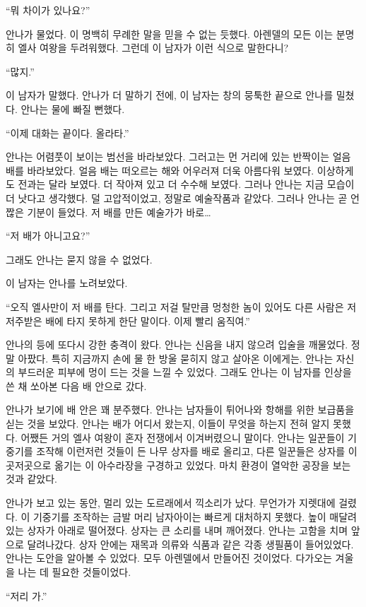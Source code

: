 ``뭐 차이가 있나요?''

안나가 물었다. 이 명백히 무례한 말을 믿을 수 없는 듯했다. 아렌델의 모든 이는 분명히 엘사 여왕을 두려워했다. 그런데 이 남자가 이런 식으로 말한다니?

``많지.''

이 남자가 말했다. 안나가 더 말하기 전에, 이 남자는 창의 뭉툭한 끝으로 안나를 밀쳤다. 안나는 물에 빠질 뻔했다.

``이제 대화는 끝이다. 올라타.''

안나는 어렴풋이 보이는 범선을 바라보았다. 그러고는 먼 거리에 있는 반짝이는 얼음 배를 바라보았다. 얼음 배는 떠오르는 해와 어우러져 더욱 아름다워 보였다. 이상하게도 전과는 달라 보였다. 더 작아져 있고 더 수수해 보였다. 그러나 안나는 지금 모습이 더 낫다고 생각했다. 덜 고압적이었고, 정말로 예술작품과 같았다. 그러나 안나는 곧 언짢은 기분이 들었다. 저 배를 만든 예술가가 바로\ldots

``저 배가 아니고요?''

그래도 안나는 묻지 않을 수 없었다.

이 남자는 안나를 노려보았다.

``오직 엘사만이 저 배를 탄다. 그리고 저걸 탈만큼 멍청한 놈이 있어도 다른 사람은 저 저주받은 배에 타지 못하게 한단 말이다. 이제 빨리 움직여.''

안나의 등에 또다시 강한 충격이 왔다. 안나는 신음을 내지 않으려 입술을 깨물었다. 정말 아팠다. 특히 지금까지 손에 물 한 방울 묻히지 않고 살아온 이에게는. 안나는 자신의 부드러운 피부에 멍이 드는 것을 느낄 수 있었다. 그래도 안나는 이 남자를 인상을 쓴 채 쏘아본 다음 배 안으로 갔다.

안나가 보기에 배 안은 꽤 분주했다. 안나는 남자들이 튀어나와 항해를 위한 보급품을 싣는 것을 보았다. 안나는 배가 어디서 왔는지, 이들이 무엇을 하는지 전혀 알지 못했다. 어쨌든 거의 엘사 여왕이 혼자 전쟁에서 이겨버렸으니 말이다. 안나는 일꾼들이 기중기를 조작해 이런저런 것들이 든 나무 상자를 배로 올리고, 다른 일꾼들은 상자를 이곳저곳으로 옮기는 이 아수라장을 구경하고 있었다. 마치 환경이 열악한 공장을 보는 것과 같았다.

안나가 보고 있는 동안, 멀리 있는 도르래에서 끽소리가 났다. 무언가가 지렛대에 걸렸다. 이 기중기를 조작하는 금발 머리 남자아이는 빠르게 대처하지 못했다. 높이 매달려있는 상자가 아래로 떨어졌다. 상자는 큰 소리를 내며 깨어졌다. 안나는 고함을 치며 앞으로 달려나갔다. 상자 안에는 재목과 의류와 식품과 같은 각종 생필품이 들어있었다. 안나는 도안을 알아볼 수 있었다. 모두 아렌델에서 만들어진 것이었다. 다가오는 겨울을 나는 데 필요한 것들이었다.

``저리 가.''

